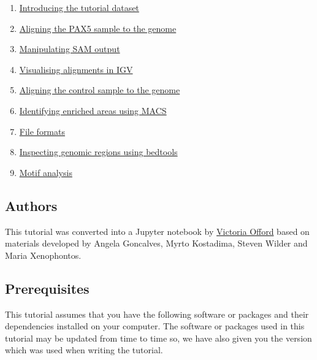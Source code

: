 \documentclass[11pt]{article}
\providecommand{\tightlist}{%
      \setlength{\itemsep}{0pt}\setlength{\parskip}{0pt}}
\begin{document}
\begin{enumerate}
\def\labelenumi{\arabic{enumi}.}
\tightlist
\item
  \href{dataset-intro.ipynb}{Introducing the tutorial dataset}
\item
  \href{pax5-alignment.ipynb}{Aligning the PAX5 sample to the genome}
\item
  \href{manipulate-sam.ipynb}{Manipulating SAM output}
\item
  \href{alignment-visualisation.ipynb}{Visualising alignments in IGV}
\item
  \href{control-alignment.ipynb}{Aligning the control sample to the
  genome}
\item
  \href{identifying-enriched-areas.ipynb}{Identifying enriched areas
  using MACS}
\item
  \href{file-formats.ipynb}{File formats}
\item
  \href{inspecting-genomic-regions.ipynb}{Inspecting genomic regions
  using bedtools}
\item
  \href{motif-analysis.ipynb}{Motif analysis}
\end{enumerate}

\hypertarget{authors}{%
\subsection{Authors}\label{authors}}

This tutorial was converted into a Jupyter notebook by
\href{https://github.com/vaofford}{Victoria Offord} based on materials
developed by Angela Goncalves, Myrto Kostadima, Steven Wilder and Maria
Xenophontos.

    \hypertarget{prerequisites}{%
\subsection{Prerequisites}\label{prerequisites}}

This tutorial assumes that you have the following software or packages
and their dependencies installed on your computer. The software or
packages used in this tutorial may be updated from time to time so, we
have also given you the version which was used when writing the
tutorial.
\end{document}

